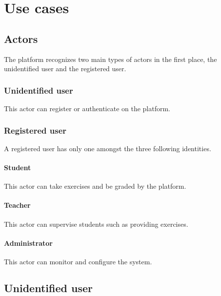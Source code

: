 \chapter{Use cases}
\section{Actors}
	The platform recognizes two main types of actors in the first place, the unidentified user and the registered user.
	\subsection{Unidentified user}
		This actor can register or authenticate on the platform.
	\subsection{Registered user}
		A registered user has only one amongst the three following identities.
		\subsubsection{Student}
			This actor can take exercises and be graded by the platform.
		\subsubsection{Teacher}
			This actor can supervise students such as providing exercises.
		\subsubsection{Administrator}
			This actor can monitor and configure the system.
\newpage
\section{Unidentified user}
